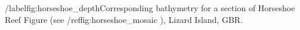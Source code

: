 /label{fig:horseshoe_depth}Corresponding bathymetry for a section of Horseshoe Reef Figure (see /ref{fig:horseshoe_mosaic} ), Lizard Island, GBR.